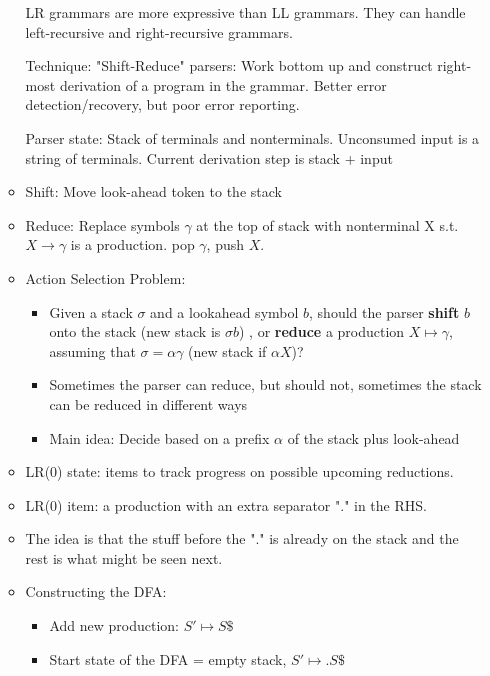 \begin{itemize}
\begin{itemize}
		LR grammars are more expressive than LL grammars. They can handle left-recursive and right-recursive grammars.
		
		Technique: "Shift-Reduce" parsers: Work bottom up and construct right-most derivation of a program in the grammar. Better error detection/recovery, but poor error reporting.
		
		Parser state: Stack of terminals and nonterminals. Unconsumed input is a string of terminals. Current derivation step is stack + input
		
		\item Shift: Move look-ahead token to the stack
		
		\item Reduce: Replace symbols $\gamma$ at the top of stack with nonterminal X s.t.  $X \rightarrow \gamma$ is a production. pop $\gamma$, push $X$. 
			
		\item Action Selection Problem:
		\begin{itemize}
			\item Given a stack $\sigma$ and a lookahead symbol $b$, should the parser \textbf{shift} $b$ onto the stack (new stack is $\sigma b$) , or \textbf{reduce} a production $X \mapsto \gamma$, assuming that $\sigma = \alpha \gamma$ (new stack if $\alpha X$)?
			\item Sometimes the parser can reduce, but should not, sometimes the stack can be reduced in different ways
			\item Main idea: Decide based on a prefix $\alpha$ of the stack plus look-ahead
		\end{itemize}
		
		\item LR(0) state: items to track progress on possible upcoming reductions.
		
		\item LR(0) item: a production with an extra separator "." in the RHS.
		
		\item The idea is that the stuff before the "." is already on the stack and the rest is what might be seen next. 
		
		\item Constructing the DFA:
		\begin{itemize}
			\item Add new production: $S' \mapsto S\$$
			
			\item Start state of the DFA = empty stack, $S' \mapsto .S\$$
			

\end{itemize}
\end{itemize}
\end{itemize}
